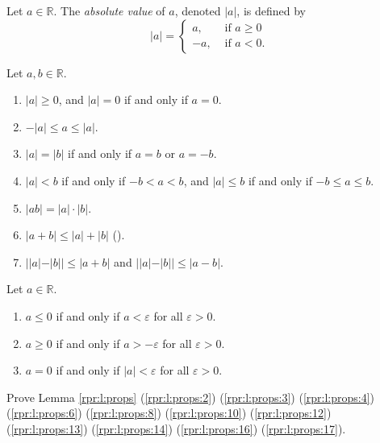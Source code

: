\begin{definition} %
	Let $a \in \mathbb{R}$. The \emph{absolute value} of $a$, denoted $|a|$, is defined by
	$$
		|a|= \begin{cases}
			a,  & \text{ if } a \geq 0 \\
			-a, & \text{ if } a < 0.
		\end{cases}
	$$
\end{definition}

\begin{lemma} %
	\label{rpr:l:abs}

	Let $a, b \in \mathbb{R}$.
	\begin{enumerate}
		\item \label{rpr:l:abs:1}
		      $|a| \geq 0$, and $|a| = 0$ if and only if $a = 0$.
		\item \label{rpr:l:abs:2}
		      $-|a| \leq a \leq |a|$.
		\item \label{rpr:l:abs:3}
		      $|a| = |b|$ if and only if $a = b$ or $a = -b$.
		\item \label{rpr:l:abs:4}
		      $|a| < b$ if and only if $-b < a < b$, and $|a| \leq b$ if and only if $-b \leq a \leq b$.
		\item \label{rpr:l:abs:5}
		      $|a b| = |a| \cdot |b|$.
		\item \label{rpr:l:abs:6} 
		      $|a + b| \leq |a| + |b|$ \quad ().
		\item \label{rpr:l:abs:7}
		      $||a| - |b|| \leq |a + b|$ and $||a| - |b|| \leq |a - b|$.
	\end{enumerate}
\end{lemma}

\begin{lemma} %
	\label{rpr:l:eps}

	Let $a \in \mathbb{R}$.
	\begin{enumerate}
		\item \label{rpr:l:eps:1}
		      $a \leq 0$ if and only if $a < \varepsilon$ for all $\varepsilon > 0$.
		\item \label{rpr:l:eps:2}
		      $a \geq 0$ if and only if $a > -\varepsilon$ for all $\varepsilon > 0$.
		\item \label{rpr:l:eps:3}
		      $a = 0$ if and only if $|a| < \varepsilon$ for all $\varepsilon > 0$.
	\end{enumerate}
\end{lemma}


\Newpage
\begin{exercise} %
	Prove Lemma \ref{rpr:l:props} (\ref{rpr:l:props:2}) (\ref{rpr:l:props:3}) (\ref{rpr:l:props:4}) (\ref{rpr:l:props:6}) (\ref{rpr:l:props:8}) (\ref{rpr:l:props:10}) (\ref{rpr:l:props:12}) (\ref{rpr:l:props:13}) (\ref{rpr:l:props:14}) (\ref{rpr:l:props:16}) (\ref{rpr:l:props:17}).
\end{exercise}

